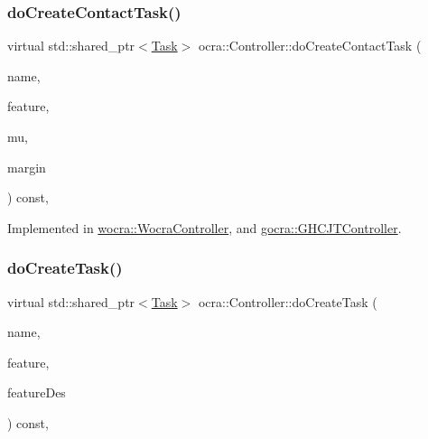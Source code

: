 \subsubsection{\texorpdfstring{do\+Create\+Contact\+Task()}{doCreateContactTask()}}
{\footnotesize\ttfamily virtual std\+::shared\+\_\+ptr$<$\hyperlink{classocra_1_1Task}{Task}$>$ ocra\+::\+Controller\+::do\+Create\+Contact\+Task (\begin{DoxyParamCaption}\item[{const std\+::string \&}]{name,  }\item[{Point\+Contact\+Feature\+::\+Ptr}]{feature,  }\item[{double}]{mu,  }\item[{double}]{margin }\end{DoxyParamCaption}) const\hspace{0.3cm}{\ttfamily [protected]}, {}}



Implemented in \hyperlink{classwocra_1_1WocraController_a60caf0250523856f915785efde7d2368}{wocra\+::\+Wocra\+Controller}, and \hyperlink{classgocra_1_1GHCJTController_a2bee2520ee73a43496cf155eb1c77548}{gocra\+::\+G\+H\+C\+J\+T\+Controller}.

\hypertarget{classocra_1_1Controller_a05f6d757e4125a71bf766df7f069ac43}{}\label{classocra_1_1Controller_a05f6d757e4125a71bf766df7f069ac43} 
\subsubsection{\texorpdfstring{do\+Create\+Task()}{doCreateTask()}\hspace{0.1cm}{\footnotesize\ttfamily [1/2]}}
{\footnotesize\ttfamily virtual std\+::shared\+\_\+ptr$<$\hyperlink{classocra_1_1Task}{Task}$>$ ocra\+::\+Controller\+::do\+Create\+Task (\begin{DoxyParamCaption}\item[{const std\+::string \&}]{name,  }\item[{Feature\+::\+Ptr}]{feature,  }\item[{Feature\+::\+Ptr}]{feature\+Des }\end{DoxyParamCaption}) const\hspace{0.3cm}{\ttfamily [protected]}, {}}



